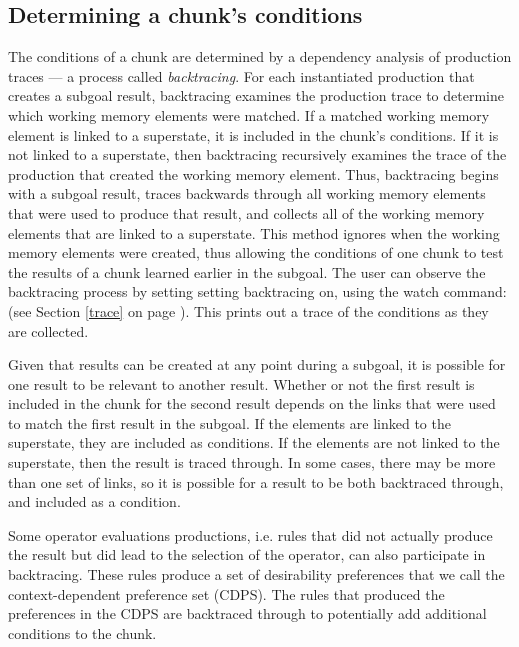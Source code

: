 \subsection{Determining a chunk's conditions}

The conditions of a chunk are determined by a dependency analysis of
production traces --- a process called \emph{backtracing}.  For each
instantiated production that creates a subgoal result, backtracing examines
the production trace to determine which working memory elements were matched.
If a matched working memory element is linked to a superstate, it is included
in the chunk's conditions. If it is not linked to a superstate, then
backtracing recursively examines the trace of the production that created the
working memory element. Thus, backtracing begins with a subgoal result, traces
backwards through all working memory elements that were used to produce that
result, and collects all of the working memory elements that are linked to a
superstate. This method ignores when the working memory elements were created,
thus allowing the conditions of one chunk to test the results of a chunk
learned earlier in the subgoal. The user can observe the backtracing process
by setting setting backtracing on, using the watch command:  (see Section \ref{trace} on page \pageref{trace}). 
This prints out a trace of the conditions as they are collected.

Given that results can be created at any point during a subgoal, it is
possible for one result to be relevant to another result. Whether or not the 
first result is included in the chunk for the second result depends on the
links that were used to match the first result in the subgoal. If the elements
are linked to the superstate, they are included as conditions. If the
elements are not linked to the superstate, then the result is traced through.
In some cases, there may be more than one set of links, so it is possible for
a result to be both backtraced through, and included as a condition.

Some operator evaluations productions, i.e. rules that did not actually produce
the result but did lead to the selection of the operator, can also participate
in backtracing.  These rules produce a set of desirability preferences that we
call the context-dependent preference set (CDPS).  The rules that produced the
preferences in the CDPS are backtraced through to potentially add additional
conditions to the chunk.

